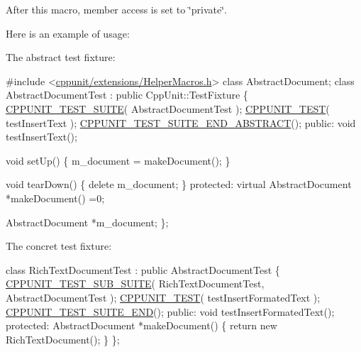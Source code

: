 After this macro, member access is set to \char`\"{}private\char`\"{}.

Here is an example of usage\-:

The abstract test fixture\-: 
\begin{DoxyCode}
\textcolor{preprocessor}{#include <\hyperlink{_helper_macros_8h}{cppunit/extensions/HelperMacros.h}>}
\textcolor{keyword}{class }AbstractDocument;
\textcolor{keyword}{class }AbstractDocumentTest : \textcolor{keyword}{public} CppUnit::TestFixture \{
  \hyperlink{group___writing_test_fixture_gabe1e12200f40d6f25d60c1783c99da81}{CPPUNIT\_TEST\_SUITE}( AbstractDocumentTest );
  \hyperlink{group___writing_test_fixture_gaac9b03d898b207e1daf2f93867935a96}{CPPUNIT\_TEST}( testInsertText );
  \hyperlink{group___writing_test_fixture_gadcb50ede05c9da831bd8b0140fb59094}{CPPUNIT\_TEST\_SUITE\_END\_ABSTRACT}();
\textcolor{keyword}{public}:
  \textcolor{keywordtype}{void} testInsertText();

  \textcolor{keywordtype}{void} setUp()
  \{
    m\_document = makeDocument();
  \}

  \textcolor{keywordtype}{void} tearDown()
  \{
    \textcolor{keyword}{delete} m\_document;
  \}
\textcolor{keyword}{protected}:
  \textcolor{keyword}{virtual} AbstractDocument *makeDocument() =0;

  AbstractDocument *m\_document;
\};
\end{DoxyCode}


The concret test fixture\-: 
\begin{DoxyCode}
\textcolor{keyword}{class }RichTextDocumentTest : \textcolor{keyword}{public} AbstractDocumentTest \{
  \hyperlink{group___writing_test_fixture_gae19f30ade82172cf6c3ff297367a10c2}{CPPUNIT\_TEST\_SUB\_SUITE}( RichTextDocumentTest, AbstractDocumentTest );
  \hyperlink{group___writing_test_fixture_gaac9b03d898b207e1daf2f93867935a96}{CPPUNIT\_TEST}( testInsertFormatedText );
  \hyperlink{group___writing_test_fixture_ga601b2e1d525f3947b216e28c625abcb1}{CPPUNIT\_TEST\_SUITE\_END}();
\textcolor{keyword}{public}:
  \textcolor{keywordtype}{void} testInsertFormatedText();
\textcolor{keyword}{protected}:
  AbstractDocument *makeDocument()
  \{
    \textcolor{keywordflow}{return} \textcolor{keyword}{new} RichTextDocument();
  \}
\};
\end{DoxyCode}


